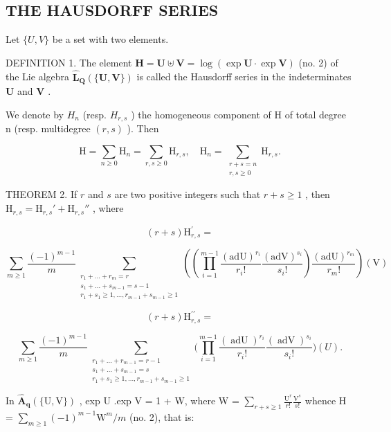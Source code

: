\subsection{THE HAUSDORFF SERIES}

Let \(\{U, V\}\) be a set with two elements.

DEFINITION 1. The element \(\mathbf{H} = \mathbf{U} \uplus \mathbf{V} = \log (\exp \mathbf{U} \cdot \exp \mathbf{V})\) (no. 2) of the Lie algebra \(\hat{\mathbf{L}}_{\mathbf{Q}}(\{\mathbf{U}, \mathbf{V}\})\) is called the Hausdorff series in the indeterminates \(\mathbf{U}\) and \(\mathbf{V}\) .

We denote by \(H_{n}\) (resp. \(H_{r,s}\) ) the homogeneous component of H of total degree n (resp. multidegree \((r, s)\) ). Then

\[
\mathrm{H} = \sum_ {n \geqslant 0} \mathrm{H} _ {n} = \sum_ {r, s \geqslant 0} \mathrm{H} _ {r, s}, \quad \mathrm{H} _ {n} = \sum_ {\substack {r + s = n \\ r, s \geqslant 0}} \mathrm{H} _ {r, s}.\tag{8}
\]

THEOREM 2. If \(r\) and \(s\) are two positive integers such that \(r + s \geqslant 1\) , then \(\mathrm{H}_{r,s} = \mathrm{H}_{r,s}' + \mathrm{H}_{r,s}''\) , where

\[
(r + s) \mathrm{H} _ {r, s} ^ {\prime} = \tag {9}
\]

\[
\sum_{m\geqslant 1}\frac{(-1)^{m - 1}}{m}\sum_{\substack{r_{1} + \dots +r_{m} = r\\ s_{1} + \dots +s_{m - 1} = s - 1\\ r_{1} + s_{1}\geqslant 1,\ldots ,r_{m - 1} + s_{m - 1}\geqslant 1}}\left(\left(\prod_{i = 1}^{m - 1}\frac{(\mathrm{adU})^{r_{i}}}{r_{i}!}\frac{(\mathrm{adV})^{s_{i}}}{s_{i}!}\right)\frac{(\mathrm{adU})^{r_{m}}}{r_{m}!}\right)(\mathrm{V})
\]

\[
(r + s) \mathrm{H} _ {r, s} ^ {\prime \prime} = \tag {10}
\]

\[
\sum_{m\geqslant 1}\frac{(-1)^{m - 1}}{m}\sum_{\substack{r_{1} + \dots +r_{m - 1} = r - 1\\ s_{1} + \dots +s_{m - 1} = s\\ r_{1} + s_{1}\geqslant 1,\dots ,r_{m - 1} + s_{m - 1}\geqslant 1}}\Bigg(\prod_{i = 1}^{m - 1}\frac{(\operatorname{adU})^{r_{i}}}{r_{i}!}\frac{(\operatorname{adV})^{s_{i}}}{s_{i}!}\Bigg)(U).
\]

In \(\hat{\mathbf{A}}_{\mathbf{q}}(\{\mathrm{U},\mathrm{V}\})\) , exp U .exp V = 1 + W, where W = \(\sum_{r+s\geqslant 1}\frac{\mathrm{U}^r}{r!}\frac{\mathrm{V}^s}{s!}\) whence H = \(\sum_{m\geqslant 1}(-1)^{m - 1}\mathrm{W}^m /m\) (no. 2), that is:

